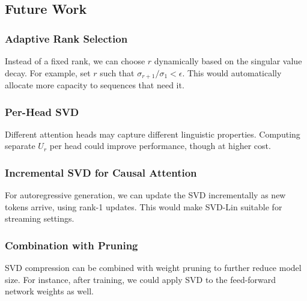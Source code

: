 \subsection{Future Work}
\subsubsection{Adaptive Rank Selection}
Instead of a fixed rank, we can choose $r$ dynamically based on the singular value decay. For example, set $r$ such that $\sigma_{r+1} / \sigma_1 < \epsilon$. This would automatically allocate more capacity to sequences that need it.

\subsubsection{Per-Head SVD}
Different attention heads may capture different linguistic properties. Computing separate $U_r$ per head could improve performance, though at higher cost.

\subsubsection{Incremental SVD for Causal Attention}
For autoregressive generation, we can update the SVD incrementally as new tokens arrive, using rank-1 updates. This would make SVD-Lin suitable for streaming settings.

\subsubsection{Combination with Pruning}
SVD compression can be combined with weight pruning to further reduce model size. For instance, after training, we could apply SVD to the feed-forward network weights as well.